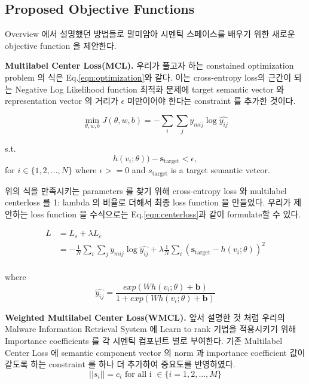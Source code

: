 



\subsection{Proposed Objective Functions}
Overview 에서 설명했던 방법들로 말미암아 시멘틱 스페이스를 배우기 위한 새로운 objective function 을 제안한다.  

\textbf{Multilabel Center Loss(MCL). }
우리가 풀고자 하는 constained optimization problem 의 식은 Eq.\ref{eqn:optimization}와 같다. 이는 cross-entropy loss의 근간이 되는 Negative Log Likelihood function 최적화 문제에 target semantic vector 와 representation vector 의 거리가 $\epsilon$ 미만이어야 한다는 constraint 를 추가한 것이다. 

\begin{equation}
\label{eqn:optimization}
\min_{\theta, w, b} J(\theta, w, b) = -\sum_i{ \sum_j{ y_{mij} \log{\hat{y_{ij}}}}}
\end{equation}

s.t.
\[
h(v_i;\theta)) - \mathbf{s}_\text{target} < \epsilon ,
\]
for $i \in \{1,2, ..., N\}$ where $\epsilon >= 0$ and $s_\text{target}$ is a target semantic vetcor.

위의 식을 만족시키는 parameters 를 찾기 위해 cross-entropy loss 와 multilabel centerloss 를 1: lambda 의 비율로 더해서 최종 loss function 을 만들었다\cite{}. 우리가 제안하는 loss function 을 수식으로는 Eq.\ref{eqn:centerloss}과 같이 formulate할 수 있다. 

\begin{equation}
\label{eqn:centerloss}
\begin{aligned}
L &= L_s + \lambda L_c \\
 &= -\frac{1}{N}\sum_i{\sum_j{ y_{mij} \log{\hat{y_{ij}}}}} 
+ \lambda \frac{1}{N} \sum_i{( \mathbf{s}_{\text{target}} - h(v_i;\theta))^2}\\
\end{aligned}
\end{equation}

where 
\[
\hat{y_{ij}} = \frac{exp(Wh(v_i;\theta)+\mathbf{b})}{ 1 + exp(Wh(v_i;\theta)+\mathbf{b})}
\]


  
\textbf{Weighted Multilabel Center Loss(WMCL). }
앞서 설명한 것 처럼 우리의 Malware Information Retrieval System 에 Learn to rank 기법을 적용시키기 위해 Importance coefficients 를 각 시멘틱 컴포넌트 별로 부여한다. 기존 Multilabel Center Loss 에 semantic component vector 의 norm 과 importance coefficient 값이 같도록 하는 constraint 를 하나 더 추가하여 중요도를 반영하였다.
\[
||s_i|| = c_i \text{ for all i }\in \{i = 1,2, ..., M\}
\]


